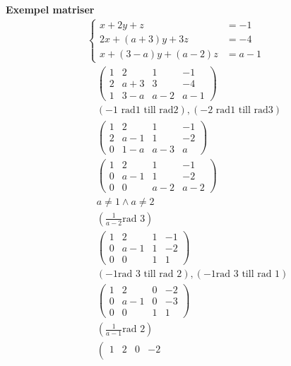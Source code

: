 \begin{multicols}{2}
\textbf{Exempel matriser}
\begin{align*}
  &\left\{\begin{array}{rr}
  x+2 y+ z&=-1 \\
  2 x+(a+3) y+ 3z&=-4 \\
  x+(3-a) y+(a-2) z & =a-1
  \end{array}\right. \\
  &\quad \left(\begin{array}{ccc|c}
    1 & 2 & 1 & -1 \\
    2 & a+3 & 3 & -4 \\
    1 & 3-a & a-2 & a-1
  \end{array}\right) \\
  &\quad (-1 \text{ rad1 till rad2}), (-2 \text{ rad1 till rad3}) \\
  &\quad \left(\begin{array}{ccc|c}
    1 & 2 & 1 & -1 \\
    2 & a-1 & 1 & -2 \\
    0 & 1-a & a-3 & a
  \end{array}\right) \\
  &\quad \left(\begin{array}{ccc|c}
    1 & 2 & 1 & -1 \\
    0 & a-1 & 1 & -2 \\
    0 & 0 & a-2 & a-2
  \end{array}\right) \\
  &\quad a \neq 1 \land a \neq 2 \\
  &\quad (\frac{1}{a-2} \text{rad 3}) \\
  &\quad \left(\begin{array}{ccc|c}
    1 & 2 & 1 & -1 \\
    0 & a-1 & 1 & -2 \\
    0 & 0 & 1 & 1
  \end{array}\right) \\
  &\quad (-1 \text{rad 3 till rad 2}), (-1 \text{rad 3 till rad 1}) \\
  &\quad \left(\begin{array}{ccc|c}
    1 & 2 & 0 & -2 \\
    0 & a-1 & 0 & -3 \\
    0 & 0 & 1 & 1
  \end{array}\right) \\
  &\quad (\frac{1}{a-1} \text{rad 2}) \\
  &\quad \left(\begin{array}{ccc|c}
    1 & 2 & 0 & -2 \\

\end{array}
\end{align*}
\end{multicols}
